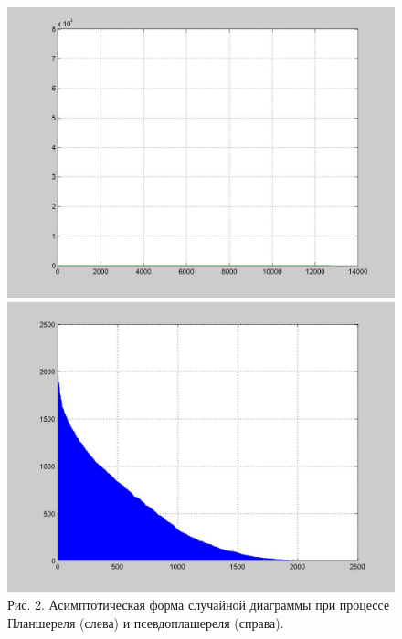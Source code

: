 \documentclass[12pt]{report}
\begin{document}
\begin{figure}[!ht]
\begin{center}
\includegraphics[scale=0.2]{Plansherel_assympt}
\includegraphics[scale=0.2]{ALPHA_assympt}
\\Рис. 2. Асимптотическая форма случайной диаграммы при процессе Планшереля (слева) и псевдоплашереля (справа).
\end{center}
\end{figure}
\end{document}
